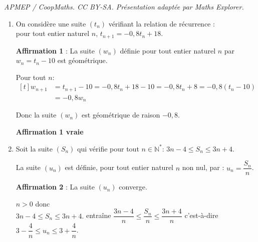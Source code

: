\documentclass[10pt]{article}
\providecommand{\blue}{\color{blue}}
\providecommand{\N}{\mathbb{N}}
\providecommand{\blue}{\color{blue}}
\providecommand{\ds}{\displaystyle}
\begin{document}
\noindent\textit{APMEP / CoopMaths. CC BY-SA. Présentation adaptée par Maths Explorer.}\par\medskip
\smallskip



\begin{enumerate}
\item On considère une suite $\left(t_n\right)$ vérifiant la relation de récurrence : \\
pour tout entier naturel $n$, $t_{n+1}= - 0,8t_n + 18.$

	\textbf{Affirmation 1} : La suite $\left(w_n\right)$ définie pour tout entier naturel $n$ par $w_n = t_n - 10$ est géométrique.

\smallskip
	
Pour tout $n$: 
$\begin{aligned}[t]
w_{n  +1} & =t_{n+1}-10 = -0,8 t_n +18 - 10 = -0,8t_n +8 = -0,8\left ( t_n-10\right)\\
&  = -0,8 w_n
\end{aligned}$

Donc la suite $(w_n)$ est géométrique de raison $-0,8$.
	
\hfill{\blue\bf Affirmation 1 vraie}	
	
\item Soit la suite $\left(S_n\right)$ qui vérifie pour tout $n\in \N^*$: $3n - 4 \leqslant S_n \leqslant 3n + 4.$

	La suite $\left(u_n\right)$ est définie, pour tout entier naturel $n$ non nul, par : $u_n=\dfrac{S_n}{n}$.
	
	\textbf{Affirmation 2} : La suite $\left(u_n\right)$ converge.
	
	\smallskip

$n>0$ donc \\
$3n - 4 \leqslant S_n \leqslant 3n + 4.$ entraîne $\dfrac{3n - 4}{n} \leqslant \dfrac{S_n}{n} \leqslant \dfrac{3n + 4}{n}$ c'est-à-dire
$3-\dfrac{4}{n} \leqslant u_n \leqslant 3+\dfrac{4}{n}$.



\end{enumerate}
\end{document}
